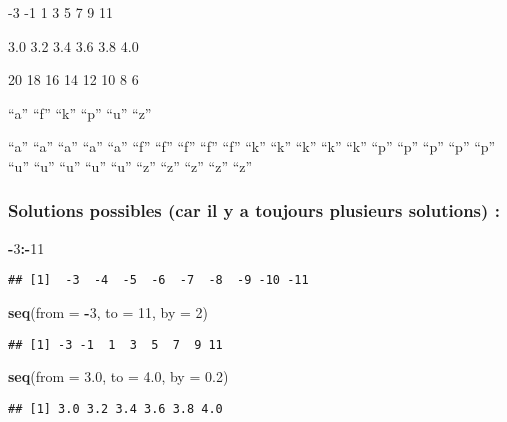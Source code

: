 \documentclass[]{book}
\newenvironment{Shaded}{\begin{snugshade}}{\end{snugshade}}
\newcommand{\KeywordTok}[1]{\textcolor[rgb]{0.13,0.29,0.53}{\textbf{#1}}}
\newcommand{\DataTypeTok}[1]{\textcolor[rgb]{0.13,0.29,0.53}{#1}}
\newcommand{\DecValTok}[1]{\textcolor[rgb]{0.00,0.00,0.81}{#1}}
\newcommand{\FloatTok}[1]{\textcolor[rgb]{0.00,0.00,0.81}{#1}}
\newcommand{\OperatorTok}[1]{\textcolor[rgb]{0.81,0.36,0.00}{\textbf{#1}}}
\newcommand{\NormalTok}[1]{#1}
\theoremstyle{definition}
\theoremstyle{definition}
\theoremstyle{definition}
\theoremstyle{remark}
\begin{document}
-3 -1 1 3 5 7 9 11

3.0 3.2 3.4 3.6 3.8 4.0

20 18 16 14 12 10 8 6

``a'' ``f'' ``k'' ``p'' ``u'' ``z''

``a'' ``a'' ``a'' ``a'' ``a'' ``f'' ``f'' ``f'' ``f'' ``f'' ``k'' ``k''
``k'' ``k'' ``k'' ``p'' ``p'' ``p'' ``p'' ``p'' ``u'' ``u'' ``u'' ``u''
``u'' ``z'' ``z'' ``z'' ``z'' ``z''

\subsubsection{Solutions possibles (car il y a toujours plusieurs
solutions)
:}\label{solutions-possibles-car-il-y-a-toujours-plusieurs-solutions}

\begin{Shaded}
\begin{Highlighting}[]
\OperatorTok{-}\DecValTok{3}\OperatorTok{:-}\DecValTok{11}
\end{Highlighting}
\end{Shaded}

\begin{verbatim}
## [1]  -3  -4  -5  -6  -7  -8  -9 -10 -11
\end{verbatim}

\begin{Shaded}
\begin{Highlighting}[]
\KeywordTok{seq}\NormalTok{(}\DataTypeTok{from =} \OperatorTok{-}\DecValTok{3}\NormalTok{, }\DataTypeTok{to =} \DecValTok{11}\NormalTok{, }\DataTypeTok{by =} \DecValTok{2}\NormalTok{)}
\end{Highlighting}
\end{Shaded}

\begin{verbatim}
## [1] -3 -1  1  3  5  7  9 11
\end{verbatim}

\begin{Shaded}
\begin{Highlighting}[]
\KeywordTok{seq}\NormalTok{(}\DataTypeTok{from =} \FloatTok{3.0}\NormalTok{, }\DataTypeTok{to =} \FloatTok{4.0}\NormalTok{, }\DataTypeTok{by =} \FloatTok{0.2}\NormalTok{)}
\end{Highlighting}
\end{Shaded}

\begin{verbatim}
## [1] 3.0 3.2 3.4 3.6 3.8 4.0
\end{verbatim}
\end{document}
